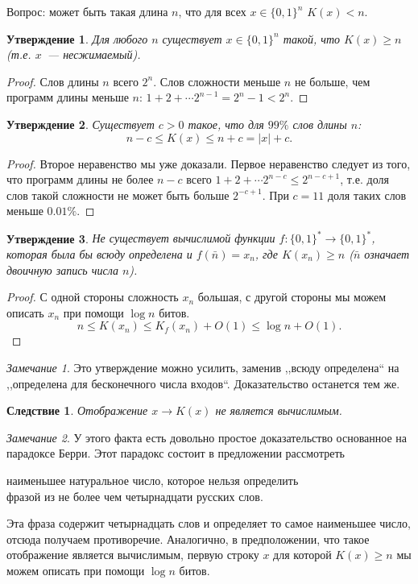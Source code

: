 \documentclass[12pt]{article}
\newcommand{\bits}{\{0,1\}}
\newcommand{\bitstr}{\bits^*}
\theoremstyle{definition}
\theoremstyle{plain}
\newtheorem{statement}{Утверждение}[section]
\newtheorem{corollary}{Следствие}[section]
\theoremstyle{remark}
\newtheorem{remark}{Замечание}[section]
\begin{document}
Вопрос: может быть такая длина $n$, что для всех $x\in\{0,1\}^n$ $K(x) < n$.
\begin{statement}
    Для любого $n$ существует $x\in\{0,1\}^n$ такой, что $K(x)\ge n$ (т.е.
    $x$~--- несжимаемый).
\end{statement}
\begin{proof}
    Слов длины $n$ всего $2^n$. Слов сложности меньше $n$ не больше, чем
    программ длины меньше $n$:
    \(
    1+2+\dotsb 2^{n-1} = 2^n - 1 < 2^n.
    \)
\end{proof}
\begin{statement}
    Существует $c > 0$ такое, что для $99\%$ слов длины $n$:
    \[
        n - c \le K(x) \le n + c = |x| + c.
    \]
\end{statement}
\begin{proof}
    Второе неравенство мы уже доказали. Первое неравенство следует из того, что
    программ длины не более $n - c$ всего $1+2+\dotsb 2^{n-c} \le 2^{n - c + 1}$,
    т.е. доля слов такой сложности не может быть больше $2^{-c + 1}$.
    При $c = 11$ доля таких слов меньше $0.01\%$. 
\end{proof}
\begin{statement}
    Не существует вычислимой функции $f:\bitstr\to\bitstr$, которая была бы
    всюду определена и $f(\bar n) = x_n$, где $K(x_n)\ge n$ ($\bar n$ означает
    двоичную запись числа $n$).
\end{statement}
\begin{proof} С одной стороны сложность $x_n$ большая, с другой стороны мы
    можем описать $x_n$ при помощи $\log n$ битов.
    \[
        n\le K(x_n)\le K_f(x_n) + O(1) \le \log n + O(1).
    \]
\end{proof}
\begin{remark}
    Это утверждение можно усилить, заменив ,,всюду определена`` на ,,определена
    для бесконечного числа входов``. Доказательство останется тем же.
\end{remark}
\begin{corollary}
    Отображение $x\to K(x)$ не является вычислимым.
\end{corollary}
\begin{remark}
    У этого факта есть довольно простое доказательство основанное на парадоксе Берри.
    Этот парадокс состоит в предложении рассмотреть 
    \begin{center}
        наименьшее натуральное число, которое нельзя определить\\ фразой
        из не более чем четырнадцати русских слов.
    \end{center}
    Эта фраза содержит четырнадцать слов и определяет то самое наименьшее число,
    отсюда получаем противоречие. Аналогично, в предположении, что такое отображение
    является вычислимым, первую строку $x$ для которой $K(x)\ge n$ мы можем описать
    при помощи $\log n$ битов.
\end{remark}
\end{document}
